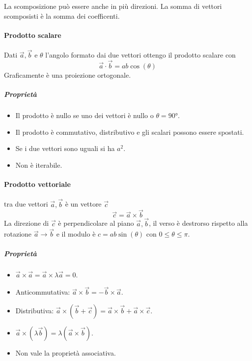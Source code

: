 La scomposizione può essere anche in più direzioni. La somma di vettori scomposisti è la somma dei coefficenti.
\paragraph{Prodotto scalare} Dati $\vec{a}, \vec{b}$ e $\theta$ l'angolo formato dai due vettori ottengo il prodotto scalare con \[\vec{a}\cdot\vec{b}=ab\cos(\theta)\] Graficamente è una proiezione ortogonale.
\subparagraph{Proprietà}
\begin{itemize}
	\item Il prodotto è nullo se uno dei vettori è nullo o $\theta=90°$.
	\item Il prodotto è commutativo, distributivo e gli scalari possono essere spostati.
	\item Se i due vettori sono uguali si ha $a^2$.
	\item Non è iterabile.
\end{itemize}
\paragraph{Prodotto vettoriale} tra due vettori $\vec{a}, \vec{b}$ è un vettore $\vec{c}$ \[\vec{c}=\vec{a}\times\vec{b}\] La direzione di $\vec{c}$ è perpendicolare al piano $\vec{a}, \vec{b}$, il verso è destrorso rispetto alla rotazione $\vec{a}\to\vec{b}$ e il modulo è $c=ab\sin(\theta)$ con $0\leqslant \theta \leqslant \pi$.
\subparagraph{Proprietà}
\begin{itemize}
	\item $\vec{a}\times\vec{a}=\vec{a}\times\lambda\vec{a}=0$.
	\item Anticommutativa: $\vec{a}\times\vec{b}=-\vec{b}\times\vec{a}$.
	\item Distributiva: $\vec{a}\times(\vec{b}+\vec{c})=\vec{a}\times\vec{b}+\vec{a}\times\vec{c}$.
	\item $\vec{a}\times(\lambda\vec{b})=\lambda(\vec{a}\times\vec{b})$.
	\item Non vale la proprietà associativa.
\end{itemize}

